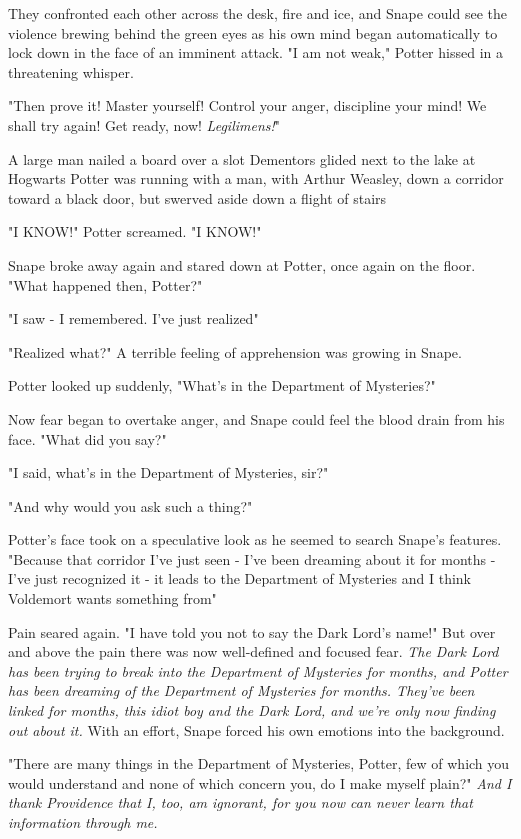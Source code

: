 They confronted each other across the desk, fire and ice, and Snape could see the violence brewing behind the green eyes as his own mind began automatically to lock down in the face of an imminent attack. "I am not weak," Potter hissed in a threatening whisper.

"Then prove it! Master yourself! Control your anger, discipline your mind! We shall try again! Get ready, now! \emph{Legilimens!}"

A large man nailed a board over a slot{\el} Dementors glided next to the lake at Hogwarts{\el} Potter was running with a man, with Arthur Weasley, down a corridor toward a black door, but swerved aside down a flight of stairs{\el}

"I KNOW!" Potter screamed. "I KNOW!"

Snape broke away again and stared down at Potter, once again on the floor. "What happened then, Potter?"

"I saw - I remembered. I've just realized{\el}"

"Realized what?" A terrible feeling of apprehension was growing in Snape.

Potter looked up suddenly, "What's in the Department of Mysteries?"

Now fear began to overtake anger, and Snape could feel the blood drain from his face. "What did you say?"

"I said, what's in the Department of Mysteries, sir?"

"And why{\el} would you ask such a thing?"

Potter's face took on a speculative look as he seemed to search Snape's features. "Because that corridor I've just seen - I've been dreaming about it for months - I've just recognized it - it leads to the Department of Mysteries{\el} and I think Voldemort wants something from{\el}"

Pain seared again. "I have told you not to say the Dark Lord's name!" But over and above the pain there was now well-defined and focused fear. \emph{The Dark Lord has been trying to break into the Department of Mysteries for months, and Potter has been dreaming of the Department of Mysteries for months. They've been linked for months, this idiot boy and the Dark Lord, and we're only now finding out about it.} With an effort, Snape forced his own emotions into the background.

"There are many things in the Department of Mysteries, Potter, few of which you would understand and none of which concern you, do I make myself plain?" \emph{And I thank Providence that I, too, am ignorant, for you now can never learn that information through me.}

